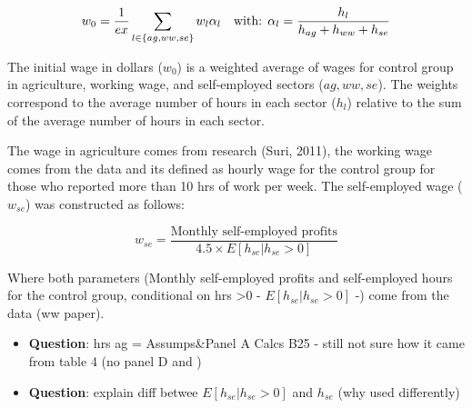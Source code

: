 \documentclass[]{article}
\begin{document}
\begin{equation}
w_0 = \frac{1}{ex} \sum_{l \in \{ag, ww, se\}}w_{l}\alpha_{l} \\ \quad \text{with: } \alpha_{l}= \frac{ h_{l}}{h_{ag} + h_{ww} + h_{se}}  
\end{equation}

The initial wage in dollars (\(w_{0}\)) is a weighted average of wages
for control group in agriculture, working wage, and self-employed
sectors (\(ag, ww, se\)). The weights correspond to the average number
of hours in each sector (\(h_l\)) relative to the sum of the average
number of hours in each sector.

The wage in agriculture comes from research (Suri, 2011), the working
wage comes from the data and its defined as hourly wage for the control
group for those who reported more than 10 hrs of work per week. The
self-employed wage (\(w_{se}\)) was constructed as follows:

\begin{equation}
w_{se} =  \frac{ \text{Monthly self-employed profits} }{4.5 \times E[h_{se}|h_{se}>0] }
\end{equation}

Where both parameters (Monthly self-employed profits and self-employed
hours for the control group, conditional on hrs \textgreater{}0 -
\(E[h_{se}|h_{se}>0]\) -) come from the data (ww paper).

\begin{itemize}
\item
  \textbf{Question}: hrs ag = Assumps\&Panel A Calcs B25 - still not
  sure how it came from table 4 (no panel D and )
\item
  \textbf{Question}: explain diff betwee \(E[h_{se}|h_{se}>0]\) and
  \(h_{se}\) (why used differently)
\end{itemize}
\end{document}

